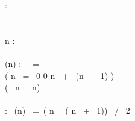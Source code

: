 \def\membertwofn#1#2{{#1 \in #2}}%
 \begin{program} 
  :\mbox{ }  \\
\zi {} \\
 \\[-0.2in]
 n :\mbox{ }   \\
 \\[-0.2in]
 (\ii n) :\mbox{ }   \mbox{ }= \\
\oo\zi\zi(  n \mbox{ }=\mbox{ } 0  0  n \mbox{ }+\mbox{ } (\ii n \mbox{ }-\mbox{ } 1) ) \\
\oo\zi\zi\zi\zo\zo {}( \lambda\mbox{ }\ii n :\mbox{ } n) \\
\oo\zo\zo\zo \\[-0.2in]
  :\mbox{ }  (\ii n) \mbox{ }=\mbox{ }( n \mbox{ }\times\mbox{ }( n \mbox{ }+\mbox{ } 1)) \mbox{ }/\mbox{ } 2 \\
\oo\zi\zi\zo\zo \\[-0.2in]
  
 \end{program}
